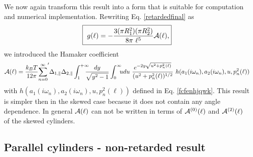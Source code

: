 \documentclass[onecolumn,letterpaper,amsmath,amssymb,floatfix,aps,superscriptaddress]{revtex4}
\begin{document}
We now again transform this result into a form that is suitable for computation and numerical implementation. Rewriting Eq. \ref{retardedfinal} as
\begin{equation}
  \fbox{
    $\displaystyle{
g(\ell) = - \frac{3 (\pi R_1^{2}) (\pi R_2^{2})}{8\pi~\ell^5} {\cal A}(\ell),}$}
\label{retardedfinal-a}
\end{equation}
we introduced the Hamaker coefficient
\begin{equation}
{\cal A}(\ell) = \frac{k_BT}{12 \pi} {\sum_{n=0}^{\infty}}' \Delta_{1,\parallel} \Delta_{2,\parallel} 
\int_{1}^{+\infty}\!\!\!\!\! \frac{dy}{\sqrt{y^2 - 1}} \int_0^{\infty}\!\!\!  u du ~\frac{e^{-2 y \sqrt{u^{2} + p_n^{2}(\ell)}}}{(u^{2} +p_n^{2}(\ell))^{1/2}} ~h(a_1(i \omega_n), a_2(i \omega_n), u, p_n^{2}(\ell))
\label{retardedfinal-b}
\end{equation}
with $h(a_1(i \omega_n), a_2(i \omega_n), u, p_n^{2}(\ell))$ defined in Eq. \ref{fcfenhjqwk}. This result is simpler then in the skewed case becasue it does not contain any angle dependence. In general ${\cal A}(\ell)$ can not be written in terms of ${\cal A}^{(0)}(\ell)$ and ${\cal A}^{(2)}(\ell)$ of the skewed cylinders.


\subsection{Parallel cylinders - non-retarded result}
\end{document}
